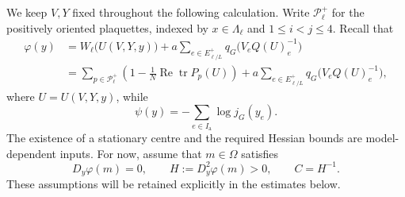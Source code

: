 \documentclass[10pt,reqno]{amsart}
\theoremstyle{definition}
\theoremstyle{remark}
\numberwithin{equation}{section}
\numberwithin{figure}{section}
\newcommand{\Ia}{I_{\mathrm a}}
\DeclareMathOperator{\tr}{tr}
\begin{document}
We keep $V,Y$ fixed throughout the following calculation.
Write $\mathcal P_\ell^+$ for the positively oriented plaquettes, indexed by
$x\in\Lambda_\ell$ and $1\le i<j\le4$. Recall that
\begin{equation}\label{eq:expanded-sector-action}
\begin{aligned}
\varphi(y)
&=W_\ell\bigl(U(V,Y,y)\bigr)
+a\sum_{e\in E_{\ell/L}^+}q_G\bigl(V_eQ(U)_e^{-1}\bigr)\\
&=\sum_{p\in\mathcal P_\ell^+}
\left(1-\frac1N\operatorname{Re}\tr P_p(U)\right)
+a\sum_{e\in E_{\ell/L}^+}q_G\bigl(V_eQ(U)_e^{-1}\bigr),
\end{aligned}
\end{equation}
where $U=U(V,Y,y)$, while
\begin{equation}\label{eq:recalled-haar-correction}
\psi(y)=-\sum_{e\in\Ia}\log j_G(y_e).
\end{equation}
The existence of a stationary centre and the required Hessian bounds are
model-dependent inputs. For now, assume that $m\in\Omega$ satisfies
\begin{equation}\label{eq:stationary-centre-input}
D_y\varphi(m)=0,\qquad
H:=D_y^2\varphi(m)>0,\qquad C=H^{-1}.
\end{equation}
These assumptions will be retained explicitly in the estimates below.
\end{document}
